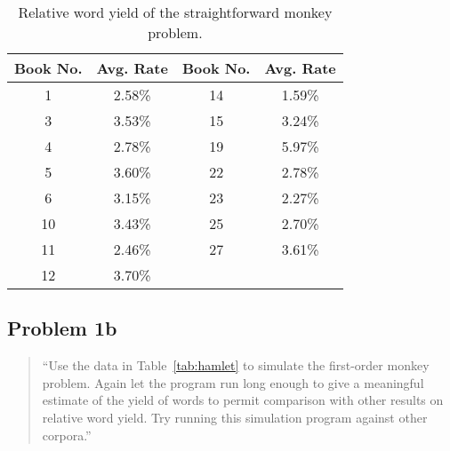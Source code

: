 \documentclass[conference]{IEEEtran}
\begin{document}
\begin{table}
\caption{Relative word yield of the straightforward monkey problem.\label{tab:problem1a}}
\vspace{-10pt}
\begin{center}
\begin{tabular}{cccc}
\hline
Book No. & Avg. Rate & Book No. & Avg. Rate \\
\hline
1  & 2.58\% & 14 & 1.59\% \\
3  & 3.53\% & 15 & 3.24\% \\
4  & 2.78\% & 19 & 5.97\% \\
5  & 3.60\% & 22 & 2.78\% \\
6  & 3.15\% & 23 & 2.27\% \\
10 & 3.43\% & 25 & 2.70\% \\
11 & 2.46\% & 27 & 3.61\% \\
12 & 3.70\% & & \\
\hline
\end{tabular}
\end{center}
\end{table}


\subsection{Problem 1b}

\begin{quote}
``Use the data in Table~\ref{tab:hamlet} to simulate the first-order monkey problem. 
Again let the program run long enough to give a meaningful estimate of the yield 
of words to permit comparison with other results on relative word yield. Try running
this simulation program against other corpora.''
\end{quote}
\end{document}
